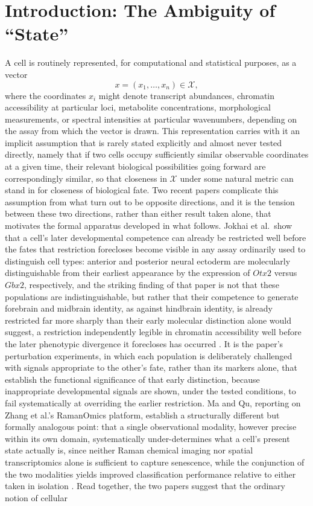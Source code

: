 \documentclass[11pt]{article}
\begin{document}
\newpage

\section*{Introduction: The Ambiguity of ``State''}

A cell is routinely represented, for computational and statistical purposes, as a vector
\begin{equation}
x = (x_1, \ldots, x_n) \in \mathcal{X},
\end{equation}
where the coordinates $x_i$ might denote transcript abundances, chromatin accessibility at particular loci, metabolite concentrations, morphological measurements, or spectral intensities at particular wavenumbers, depending on the assay from which the vector is drawn. This representation carries with it an implicit assumption that is rarely stated explicitly and almost never tested directly, namely that if two cells occupy sufficiently similar observable coordinates at a given time, their relevant biological possibilities going forward are correspondingly similar, so that closeness in $\mathcal{X}$ under some natural metric can stand in for closeness of biological fate. Two recent papers complicate this assumption from what turn out to be opposite directions, and it is the tension between these two directions, rather than either result taken alone, that motivates the formal apparatus developed in what follows. Jokhai et al.\ show that a cell's later developmental competence can already be restricted well before the fates that restriction forecloses become visible in any assay ordinarily used to distinguish cell types: anterior and posterior neural ectoderm are molecularly distinguishable from their earliest appearance by the expression of $Otx2$ versus $Gbx2$, respectively, and the striking finding of that paper is not that these populations are indistinguishable, but rather that their competence to generate forebrain and midbrain identity, as against hindbrain identity, is already restricted far more sharply than their early molecular distinction alone would suggest, a restriction independently legible in chromatin accessibility well before the later phenotypic divergence it forecloses has occurred \cite{jokhai2026}. It is the paper's perturbation experiments, in which each population is deliberately challenged with signals appropriate to the other's fate, rather than its markers alone, that establish the functional significance of that early distinction, because inappropriate developmental signals are shown, under the tested conditions, to fail systematically at overriding the earlier restriction. Ma and Qu, reporting on Zhang et al.'s RamanOmics platform, establish a structurally different but formally analogous point: that a single observational modality, however precise within its own domain, systematically under-determines what a cell's present state actually is, since neither Raman chemical imaging nor spatial transcriptomics alone is sufficient to capture senescence, while the conjunction of the two modalities yields improved classification performance relative to either taken in isolation \cite{maqu2026}. Read together, the two papers suggest that the ordinary notion of cellular 
\end{document}
